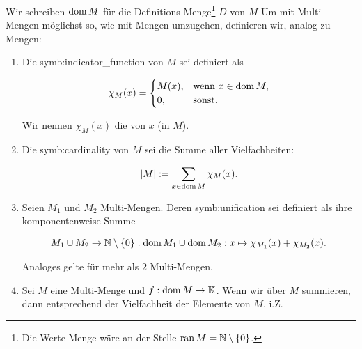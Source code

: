            Wir schreiben $\operatorname{dom} M$ für die Definitions-Menge\footnote{Die Werte-Menge wäre an der Stelle $\operatorname{ran} M = \mathbb N \setminus {\left \{ 0 \right \}}$.} $D$ von $M$
            Um mit Multi-Mengen möglichst so, wie mit Mengen umzugehen, definieren wir, analog zu Mengen:

            \begin{enumerate}[label = \arabic*.]

                \item Die  \gls{symb:indicator_function} von $M$ sei definiert als

                \begin{align*}
                    \chi_M(x)
                    =
                    \begin{cases}
                        M(x), & \text{wenn} ~ x \in \operatorname{dom} M, \\
                        0,    & \text{sonst}.
                    \end{cases}
                \end{align*}

                Wir nennen $\chi_M(x)$ die  von $x$ (in $M$).

                \item Die  \gls{symb:cardinality} von $M$ sei die Summe aller Vielfachheiten:

                \begin{align*}
                    |M| := \sum_{x \in \operatorname{dom} M} \chi_M(x).
                \end{align*}

                \item Seien $M_1$ und $M_2$ Multi-Mengen.
                Deren  \gls{symb:unification} sei definiert als ihre komponentenweise Summe

                \begin{align*}
                    M_1 \cup M_2 \to \mathbb N \setminus {\left \{ 0 \right \}}:
                        \operatorname{dom} M_1 \cup \operatorname{dom} M_2:
                            x \mapsto \chi_{M_1}(x) + \chi_{M_2}(x).
                \end{align*}

                Analoges gelte für mehr als $2$ Multi-Mengen.

                \item Sei $M$ eine Multi-Menge und $f: \operatorname{dom} M \to \mathbb K$.
                Wenn wir über $M$ summieren, dann entsprechend der Vielfachheit der Elemente von $M$, i.Z.


\end{enumerate}
